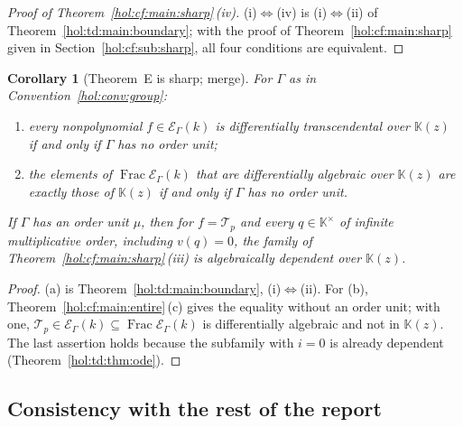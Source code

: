 \documentclass[11pt]{article}
\numberwithin{equation}{section}
\newtheorem{corollary}[theorem]{Corollary}
\theoremstyle{definition}
\theoremstyle{remark}
\newcommand{\KK}{\mathbb K}
\newcommand{\EK}{\mathcal E_\Gamma(k)}
\newcommand{\FE}{\operatorname{Frac}\EK}
\begin{document}
\begin{proof}[Proof of Theorem~\ref{hol:cf:main:sharp}\,\textup{(iv)}]
(i)$\Leftrightarrow$(iv) is (i)$\Leftrightarrow$(ii) of
Theorem~\ref{hol:td:main:boundary}; with the proof of
Theorem~\ref{hol:cf:main:sharp} given in Section~\ref{hol:cf:sub:sharp}, all
four conditions are equivalent.
\end{proof}

\begin{corollary}[Theorem~E is sharp; merge]\label{hol:td:cor:sharp}
For $\Gamma$ as in Convention~\ref{hol:conv:group}:
\begin{enumerate}[label=\textup{(\alph*)}]
\item every nonpolynomial $f\in\EK$ is differentially transcendental over
$\KK(z)$ if and only if $\Gamma$ has no order unit;
\item the elements of $\FE$ that are differentially algebraic over $\KK(z)$
are exactly those of $\KK(z)$ if and only if $\Gamma$ has no order unit.
\end{enumerate}
If $\Gamma$ has an order unit $\mu$, then for $f=\mathcal T_p$ and every
$q\in\KK^\times$ of infinite multiplicative order, including $v(q)=0$, the
family of Theorem~\ref{hol:cf:main:sharp}\,\textup{(iii)} is algebraically
dependent over $\KK(z)$.
\end{corollary}

\begin{proof}
(a) is Theorem~\ref{hol:td:main:boundary}, (i)$\Leftrightarrow$(ii). For (b),
Theorem~\ref{hol:cf:main:entire}\,(c) gives the equality without an order unit;
with one, $\mathcal T_p\in\EK\subseteq\FE$ is differentially algebraic and not
in $\KK(z)$. The last assertion holds because the subfamily with $i=0$ is
already dependent (Theorem~\ref{hol:td:thm:ode}).
\end{proof}

\subsection{Consistency with the rest of the report}
\label{hol:td:sub:consistency}
\end{document}
